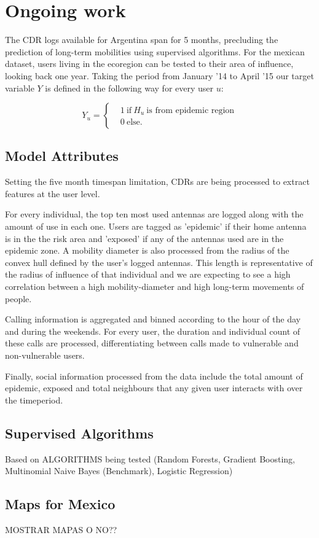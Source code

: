 \section{Ongoing work}

The CDR logs available for Argentina span for 5 months, precluding the prediction of long-term mobilities using supervised algorithms. For the mexican dataset, users living in the ecoregion can be tested to their area of influence, looking back one year. Taking the period from January '14 to April '15 our target variable $Y $ is defined in the following way for every user $u$: 

\[
    Y_u =
      \begin{cases}
        &1 \ \mbox{if} \ H_u \ \mbox{is from epidemic region}\\
        &0 \ \mbox{else}.
      \end{cases}
    \]
    
\subsection{Model Attributes}
Setting the five month timespan limitation, CDRs are being processed to extract features at the user level. 

For every individual, the top ten most used antennas are logged along with the amount of use in each one. Users are tagged as 'epidemic' if their home antenna is in the the risk area and 'exposed' if any of the antennas used are in the epidemic zone. A mobility diameter is also processed from the radius of the convex hull defined by the user's logged antennas. This length is representative of the radius of influence of that individual and we are expecting to see a high correlation between a high mobility-diameter and high long-term movements of people.

Calling information is aggregated and binned according to the hour of the day and during the weekends. For every user, the duration and individual count of these calls are processed, differentiating between calls made to vulnerable and non-vulnerable users. 

Finally, social information processed from the data include the total amount of epidemic, exposed and total neighbours that any given user interacts with over the timeperiod. 

\subsection{Supervised Algorithms}
Based on 
ALGORITHMS being tested (Random Forests, Gradient Boosting, Multinomial Naive Bayes (Benchmark), Logistic Regression)


\subsection{Maps for Mexico}
MOSTRAR MAPAS O NO??
